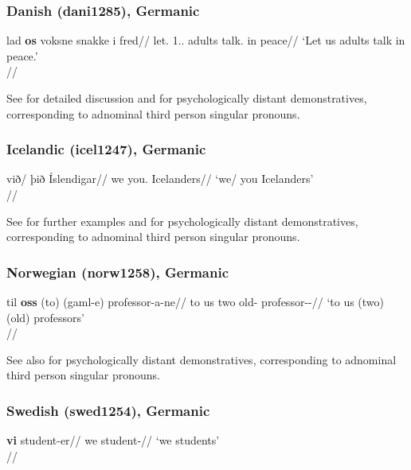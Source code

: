 \subsubsection{Danish (dani1285), Germanic}

\ex \begingl
\gla lad \textbf{os} voksne snakke i fred//
\glb let.\Imp{} 1.\Pl.\Acc{} adults talk.\Inf{} in peace//
\glft `Let us adults talk in peace.’\\\citep[29, (32b)]{schroeter2021}//
\endgl
\xe

See \citet{schroeter2021} for detailed discussion and \citet{johannessen2008} for psychologically distant demonstratives, corresponding to adnominal third person singular pronouns. 

\subsubsection{Icelandic (icel1247), Germanic}

\ex
\begingl
\gla við/ þið Íslendigar//
\glb we you.\Pl{} Icelanders//
\glft `we/ you Icelanders'\\\citep[11, (16a)]{sigurdssonwood2020}//
\endgl
\xe

See \citet[11f.]{sigurdssonwood2020} for further examples and \citet{johannessen2008} for psychologically distant demonstratives, corresponding to adnominal third person singular pronouns. 

\subsubsection{Norwegian (norw1258), Germanic}

\ex 
\begingl
\gla til \textbf{oss} (to) (gaml-e) professor-a-ne//
\glb to us two old-\Def{} professor-\Pl-\Def{}// 
\glft `to us (two) (old) professors' \\\citep[129, (4.36)]{julien2005}//
\endgl
\xe

See also \citet{johannessen2008} for psychologically distant demonstratives, corresponding to adnominal third person singular pronouns. 

\subsubsection{Swedish (swed1254), Germanic}

\ex 
\begingl
\gla \textbf{vi} student-er//
\glb we student-\Pl{}//
\glft `we students'\\\citep[128, fn. 18, (ia)]{julien2005}//
\endgl
\xe

